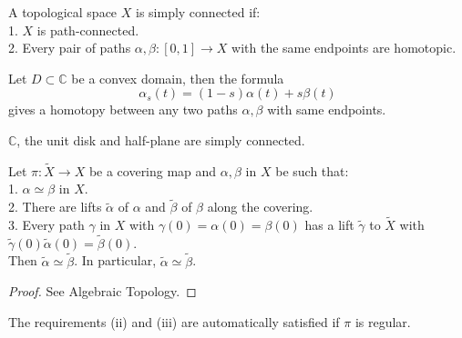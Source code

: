 \begin{definition}
    A topological space $X$ is simply connected if:\\
    1. $X$ is path-connected.\\
    2. Every pair of paths $\alpha,\beta:[0,1]\to X$ with the same endpoints are homotopic.
\end{definition}
\begin{remark}
    Let $D\subset\mathbb C$ be a convex domain, then the formula
    $$\alpha_s(t)=(1-s)\alpha(t)+s\beta(t)$$
    gives a homotopy between any two paths $\alpha,\beta$ with same endpoints.
\end{remark}
\begin{example}
    $\mathbb C$, the unit disk and half-plane are simply connected.
\end{example}
\begin{theorem}\label{monodromy}
    Let $\pi:\tilde{X}\to X$ be a covering map and $\alpha,\beta$ in $X$ be such that:\\
    1. $\alpha\simeq\beta$ in $X$.\\
    2. There are lifts $\tilde\alpha$ of $\alpha$ and $\tilde\beta$ of $\beta$ along the covering.\\
    3. Every path $\gamma$ in $X$ with $\gamma(0)=\alpha(0)=\beta(0)$ has a lift $\tilde{\gamma}$ to $\tilde{X}$ with $\tilde{\gamma}(0)\tilde{\alpha}(0)=\tilde{\beta}(0)$.\\
    Then $\tilde{\alpha}\simeq\tilde{\beta}$.
    In particular, $\tilde{\alpha}\simeq\tilde{\beta}$.
\end{theorem}
\begin{proof}
    See Algebraic Topology.
\end{proof}
\begin{note}
    The requirements (ii) and (iii) are automatically satisfied if $\pi$ is regular.
\end{note}